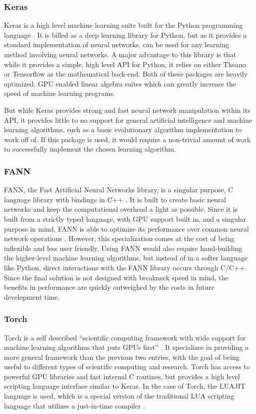 \documentclass[draftclsnofoot,onecolumn,letterpaper,10pt]{IEEEtran}
\begin{document}
\subsubsection{Keras}
Keras is a high level machine learning suite built for the Python programming language \cite{keras}.
It is billed as a deep learning library for Python, but as it provides a standard implementation of neural networks, can be used for any learning method involving neural networks.
A major advantage to this library is that while it provides a simple, high level API for Python, it relies on either Theano or Tensorflow as the mathematical back-end.
Both of these packages are heavily optimized, GPU enabled linear algebra suites which can greatly increase the speed of machine learning programs.

But while Keras provides strong and fast neural network manipulation within its API, it provides little to no support for general artificial intelligence and machine learning algorithms, such as a basic evolutionary algorithm implementation to work off of.
If this package is used, it would require a non-trivial amount of work to successfully implement the chosen learning algorithm.

\subsubsection{FANN}
FANN, the Fast Artificial Neural Networks library, is a singular purpose, C language library with bindings in C++ \cite{fann}.
It is built to create basic neural networks and keep the computational overhead a light as possible.
Since it is built from a strictly typed language, with GPU support built in, and a singular purpose in mind, FANN is able to optimize its performance over common neural network operations \cite{fann}.
However, this specialization comes at the cost of being inflexible and less user friendly.
Using FANN would also require hand-building the higher-level machine learning algorithms, but instead of in a softer language like Python, direct interactions with the FANN library occurs through C/C++.
Since the final solution is not designed with breakneck speed in mind, the benefits in performance are quickly outweighed by the costs in future development time.

\subsubsection{Torch}
Torch is a self described ``scientific computing framework with wide support for machine learning algorithms that puts GPUs first'' \cite{torch}.
It specializes in providing a more general framework than the previous two entries, with the goal of being useful to different types of scientific computing and research.
Torch has access to powerful GPU libraries and fast internal C routines, but provides a high level scripting language interface similar to Keras.
In the case of Torch, the LUAJIT language is used, which is a special version of the traditional LUA scripting language that utilizes a just-in-time compiler \cite{torch}.
\end{document}
